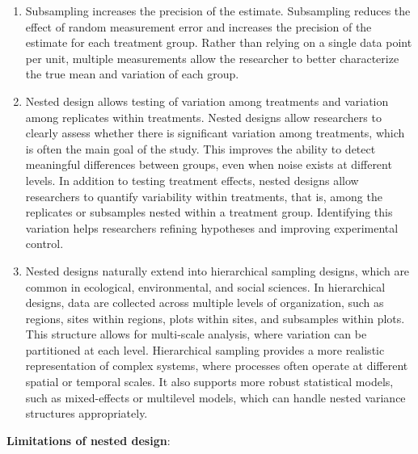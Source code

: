\documentclass[
]{book}
\providecommand{\tightlist}{%
  \setlength{\itemsep}{0pt}\setlength{\parskip}{0pt}}
\begin{document}
\begin{enumerate}
\def\labelenumi{\arabic{enumi}.}
\tightlist
\item
  Subsampling increases the precision of the estimate. Subsampling reduces the effect of random measurement error and increases the precision of the estimate for each treatment group. Rather than relying on a single data point per unit, multiple measurements allow the researcher to better characterize the true mean and variation of each group.
\item
  Nested design allows testing of variation among treatments and variation among replicates within treatments. Nested designs allow researchers to clearly assess whether there is significant variation among treatments, which is often the main goal of the study. This improves the ability to detect meaningful differences between groups, even when noise exists at different levels. In addition to testing treatment effects, nested designs allow researchers to quantify variability within treatments, that is, among the replicates or subsamples nested within a treatment group. Identifying this variation helps researchers refining hypotheses and improving experimental control.
\item
  Nested designs naturally extend into hierarchical sampling designs, which are common in ecological, environmental, and social sciences. In hierarchical designs, data are collected across multiple levels of organization, such as regions, sites within regions, plots within sites, and subsamples within plots. This structure allows for multi-scale analysis, where variation can be partitioned at each level. Hierarchical sampling provides a more realistic representation of complex systems, where processes often operate at different spatial or temporal scales. It also supports more robust statistical models, such as mixed-effects or multilevel models, which can handle nested variance structures appropriately.
\end{enumerate}

\textbf{Limitations of nested design}:
\end{document}
